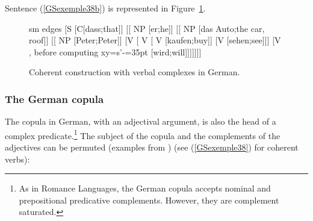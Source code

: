 \documentclass[output=paper
	        ,collection
	        ,collectionchapter
 	        ,biblatex
                ,babelshorthands
                ,newtxmath
                ,draftmode
                ,colorlinks, citecolor=brown
]{langscibook}
\begin{document}
{Sentence (\ref{GSexemple38b}) is represented in Figure~\ref{GSfigure11}. 



\begin{figure}
    \centering
    {\footnotesize
	\begin{forest}
	sm edges
	[S
		[C[dass;that]]
    	[[ NP [er;he]]
     		[[ NP [das Auto;the car, roof]]
     			[[ NP [Peter;Peter]]
     			[V 
			     				[ V 
                		[ V  
                			[kaufen;buy]]
                		[V  [sehen;see]]]
     [V , before computing xy={s'-=35pt} [wird;will]]]]]]]
 \end{forest}}    
    \caption{Coherent construction with verbal complexes in German.}
    \label{GSfigure11}
\end{figure}



\subsubsection{The German copula}\label{GSsection4.1.3}

The copula in German, with an adjectival argument, is also the head of a complex predicate.\footnote{As in Romance Languages, the German copula accepts nominal and prepositional predicative complements. However, they are complement saturated.} The subject of the copula and the complements of the adjectives can be permuted (examples from \citealt[68]{Mueller2002b}) (see (\ref{GSexemple38}) for coherent verbs):

\eal 
	\label{GSexemple45} 
    \label{GSexemple45a}

}
\end{document}
